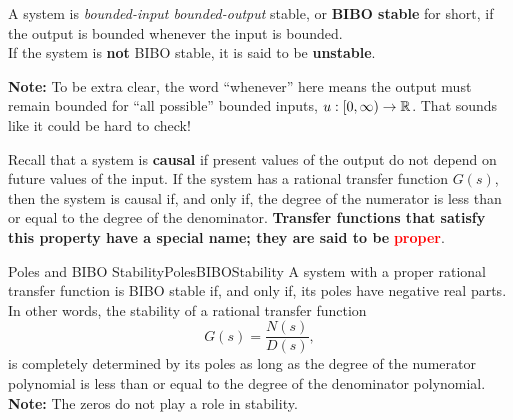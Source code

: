 \begin{tcolorbox}[colback=mylightblue, title = {\bf BIBO Stability}, breakable]

\begin{definition} 
\label{def:BIBOstable}
A system is \emph{bounded-input bounded-output} stable, or \textbf{BIBO stable} for short, if the output is bounded whenever the input is bounded. \\

If the system is \textbf{not} BIBO stable, it is said to be \textbf{unstable}.
\end{definition}

\textbf{Note:} To be extra clear, the word ``whenever'' here means the output must remain bounded for ``all possible'' bounded inputs, $u:[0, \infty) \to \mathbb R$. That sounds like it could be hard to check!
\end{tcolorbox}

\vspace*{.2cm}

Recall that a system is \textbf{causal} if present values of the output do not depend on future values of the input. If the system has a rational transfer function $G(s)$, then the system is causal if, and only if, the degree of the numerator is less than or equal to the degree of the denominator. \textbf{Transfer functions that satisfy this property have a special name; they are said to be} \textcolor{red}{\bf proper}.

\vspace*{.2cm}

\begin{propColor}{Poles and BIBO Stability}{PolesBIBOStability}
    A system with a proper rational transfer function is BIBO stable if, and only if, its poles have negative real parts. In other words, the stability of a rational transfer function
$$G(s)=\frac{N(s)}{D(s)},$$
is completely determined by its poles as long as the degree of the numerator polynomial is less than or equal to the degree of the denominator polynomial. \\

\textbf{Note:} The zeros do not play a role in stability.
\end{propColor}

\vspace*{.2cm}

